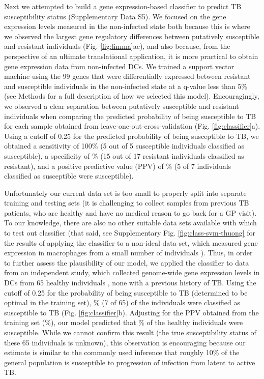 \documentclass[fleqn,10pt]{wlscirep}
\begin{document}
Next we attempted to build a gene expression-based classifier to
predict TB susceptibility status (Supplementary Data S5). We focused
on the gene expression levels measured in the non-infected state both
because this is where we observed the largest gene regulatory
differences between putatively susceptible and resistant individuals
(Fig. \ref{fig:limma}ac), and also because, from the perspective of an
ultimate translational application, it is more practical to obtain
gene expression data from non-infected DCs. We trained a support
vector machine using the 99 genes that were differentially expressed
between resistant and susceptible individuals in the non-infected
state at a q-value less than 5\% (see Methods for a full description
of how we selected this model). Encouragingly, we observed a clear
separation between putatively susceptible and resistant individuals
when comparing the predicted probability of being susceptible to TB
for each sample obtained from leave-one-out-cross-validation (Fig.
\ref{fig:classifier}a). Using a cutoff of 0.25 for the predicted
probability of being susceptible to TB, we obtained a sensitivity of
100\% (5 out of 5 susceptible individuals classified as susceptible),
a specificity of \% (15 out of 17 resistant individuals
classified as resistant), and a positive predictive value (PPV) of
\% (5 of 7 individuals classified as susceptible were
susceptible).

Unfortunately our current data set is too small to properly split into
separate training and testing sets (it is challenging to collect
samples from previous TB patients, who are healthy and have no medical
reason to go back for a GP visit). To our knowledge, there are also no
other suitable data sets available with which to test out classifier
(that said, see Supplementary Fig. \ref{fig:class-svm-thuong} for the
results of applying the classifier to a non-ideal data set, which
measured gene expression in macrophages from a small number of
individuals \cite{Thuong2008}). Thus, in order to further assess the
plausibility of our model, we applied the classifier to data from an
independent study, which collected genome-wide gene expression levels
in DCs from 65 healthy individuals \cite{Barreiro2012}, none with a
previous history of TB. Using the cutoff of 0.25 for the probability
of being susceptible to TB (determined to be optimal in the training
set), \% (7 of 65) of the individuals were classified
as susceptible to TB (Fig. \ref{fig:classifier}b). Adjusting for the
PPV obtained from the training set (\%), our model
predicted that \% of the healthy individuals were
susceptible. While we cannot confirm this result (the true
susceptibility status of these 65 individuals is unknown), this
observation is encouraging because our estimate is similar to the
commonly used inference that roughly 10\% of the general population is
susceptible to progression of infection from latent to active TB.
\end{document}

